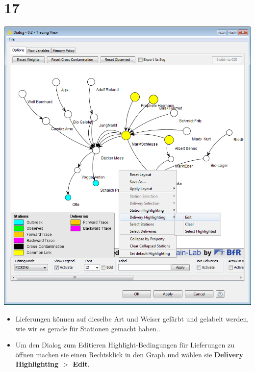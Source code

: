 \documentclass{beamer}
\begin{document}
\section{17}
\begin{frame}
	\begin{center}
  		\includegraphics[height=0.6\textheight]{17.png}
	\end{center}
	\begin{itemize}
		\item Lieferungen können auf dieselbe Art und Weiser gefärbt und gelabelt werden, wie wir es gerade für Stationen gemacht haben..
		\item Um den Dialog zum Editieren Highlight-Bedingungen für Lieferungen zu öffnen machen sie einen Rechtsklick in den Graph und wählen sie \textbf{Delivery Highlighting $>$ Edit}.
	\end{itemize}
\end{frame}
\end{document}
